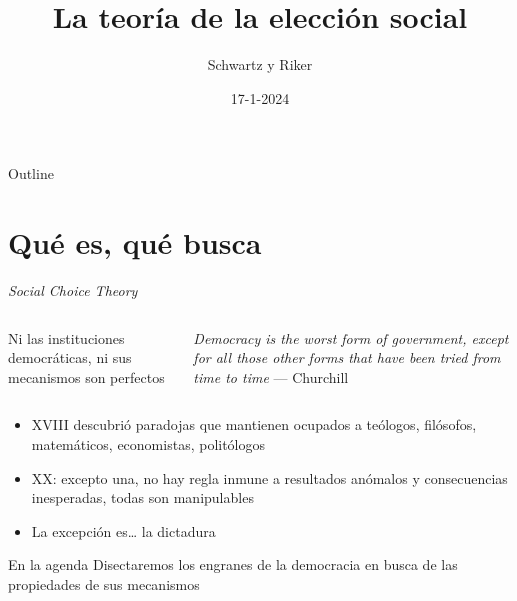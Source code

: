 \documentclass[bigger]{beamer}
\author{Schwartz y Riker}
\date{17-1-2024}
\title{La teoría de la elección social}
\begin{document}
\maketitle
\begin{frame}{Outline}
\tableofcontents
\end{frame}


\section{Qué es, qué busca}
\label{sec:orgcf908aa}
\begin{frame}[label={sec:orgd0f06d8}]{\emph{Social Choice Theory}}
\begin{columns}
\begin{column}{0.45\columnwidth}
Ni las instituciones democráticas, ni sus mecanismos son perfectos
\end{column}
\begin{column}{0.55\columnwidth}
\footnotesize
\emph{Democracy is the worst form of government, except for all those other forms that have been tried from time to time} --- Churchill
\pause \bigskip \bigskip
\end{column}
\end{columns}
\begin{itemize}[<+->]
\item XVIII descubrió paradojas que mantienen ocupados a teólogos, filósofos, matemáticos, economistas, politólogos
\item XX: excepto una, no hay regla inmune a resultados anómalos y consecuencias inesperadas, todas son manipulables
\item La excepción es\ldots{} la dictadura
\end{itemize}
\bigskip \pause
\begin{block}{En la agenda}
Disectaremos los engranes de la democracia en busca de las \alert{propiedades de sus mecanismos}
\end{block}
\end{frame}
\end{document}
